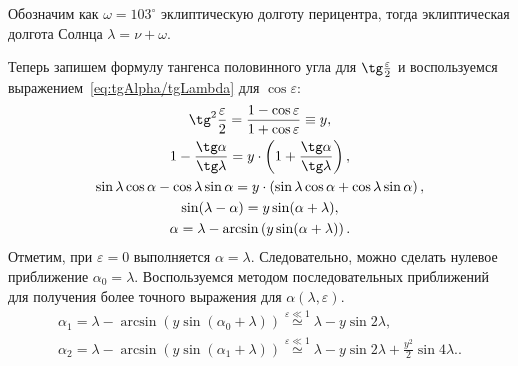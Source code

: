 Обозначим как $\omega = 103^\circ$ эклиптическую долготу перицентра, тогда эклиптическая долгота Солнца $\lambda = \nu + \omega$.



Теперь запишем формулу тангенса половинного угла для $\tg \frac{\varepsilon}{2}$ и воспользуемся выражением~\eqref{eq:tgAlpha/tgLambda} для $\cos \varepsilon$:
\begin{gather*}
    \tg^2 \frac{\varepsilon}{2} = \frac{1 - \cos \varepsilon}{1 + \cos \varepsilon} \equiv y ,\\
    1 - \frac{\tg \alpha}{\tg \lambda} = y \cdot \left( 1 + \frac{\tg \alpha}{\tg \lambda} \right),\\
    \sin \lambda \cos \alpha - \cos \lambda \sin \alpha = y \cdot \left( \sin \lambda \cos \alpha + \cos \lambda \sin \alpha \right),\\
    \sin ( \lambda - \alpha ) = y \sin(\alpha + \lambda),\\
    \alpha = \lambda - \arcsin \left( y \sin( \alpha + \lambda) \right).
\end{gather*}
Отметим, при $\varepsilon = 0$ выполняется $\alpha = \lambda$. Следовательно, можно сделать нулевое приближение $\alpha_0 = \lambda$. Воспользуемся методом последовательных приближений для получения более точного выражения для $\alpha(\lambda, \varepsilon)$.
\begin{gather}
    \alpha_1 = \lambda - \arcsin \left( y \sin (\alpha_0 + \lambda)  \right) \overset{\varepsilon \ll 1}{\simeq} \lambda - y \sin 2 \lambda,\nonumber\\
    \alpha_2
        = \lambda - \arcsin \left( y \sin (\alpha_1 + \lambda) \right)
        \overset{\varepsilon \ll 1}{\simeq} \lambda - y \sin 2 \lambda + \frac{y^2}{2} \sin 4 \lambda. \label{eq:second-approx-alpha-lambda}.
\end{gather}

